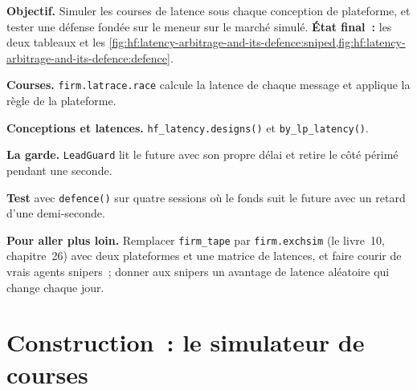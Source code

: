 \begin{tutorial}
\textbf{Objectif.} Simuler les courses de latence sous chaque conception de plateforme, et tester une défense fondée sur le meneur sur le marché simulé. \textbf{État final~:} les deux
tableaux et les \cref{fig:hf:latency-arbitrage-and-its-defence:sniped,fig:hf:latency-arbitrage-and-its-defence:defence}.
\begin{tutsteps}
\item \textbf{Courses.} \texttt{firm.latrace.race} calcule la latence de chaque message et applique la règle de la plateforme.
\label{lst:hf:latency-arbitrage-and-its-defence:race}
\item \textbf{Conceptions et latences.} \texttt{hf\_latency.designs()} et \texttt{by\_lp\_latency()}.
\item \textbf{La garde.} \texttt{LeadGuard} lit le future avec son propre délai et retire le côté périmé pendant une seconde.
\label{lst:hf:latency-arbitrage-and-its-defence:guard}
\item \textbf{Test} avec \texttt{defence()} sur quatre sessions où le fonds suit le future avec un retard d'une demi-seconde.
\end{tutsteps}
\textbf{Pour aller plus loin.} Remplacer \texttt{firm\_tape} par \texttt{firm.exchsim} (le livre~10, chapitre~26) avec deux plateformes et une
matrice de latences, et faire courir de vrais agents snipers~; donner aux snipers un avantage de latence aléatoire qui change chaque jour.
\end{tutorial}

\section{Construction~: le simulateur de courses}\label{bld:hf:latency-arbitrage-and-its-defence:latrace}

